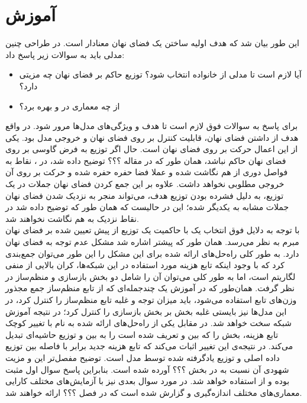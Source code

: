 \section{آموزش \autoencoder{}}
این طور بیان شد که هدف اولیه ساختن یک فضای نهان معنادار است. در طراحی چنین مدلی باید به سوالات زیر پاسخ داد:
\begin{itemize}
	\item
	      آیا لازم است تا مدلی از خانواده \vae{}  انتخاب شود؟ توزیع حاکم بر فضای نهان چه مزیتی دارد؟
	\item
	      از چه معماری در \encoder{} و \decoder{} بهره برد؟
\end{itemize}
برای پاسخ به سوالات فوق لازم است تا هدف و ویژگی‌های مدل‌ها مرور شود. در واقع هدف از داشتن فضای نهان، قابلیت کنترل بر روی فضای نهان و خروجی مدل بود. یکی از این اعمال حرکت بر روی فضای نهان است. حال اگر توزیع به فرض گاوسی بر روی فضای نهان حاکم نباشد، همان طور که در مقاله ؟؟؟ توضیح داده شد، در \autoencoder{}، نقاط به فواصل دوری از هم نگاشت شده و عملا فضا حفره حفره شده و حرکت بر روی آن خروجی مطلوبی نخواهد داشت. علاوه بر این جمع کردن فضای نهان جملات در یک توزیع، به دلیل فشرده بودن توزیع هدف، می‌تواند منجر به نزدیک شدن فضای نهان جملات مشابه به یکدیگر شده؛ این در حالیست که همان طور که توضیح داده شد در   \autoencoder{} نقاط نزدیک به هم نگاشت نخواهند شد.
\\
با توجه به دلایل فوق انتخاب یک \autoencoder{} با حاکمیت یک توزیع از پیش تعیین شده بر فضای نهان مبرم به نظر می‌رسد. همان طور که پیشتر اشاره شد \vae{} مشکل عدم توجه به فضای نهان دارد. به طور کلی راه‌حل‌های ارائه شده برای این مشکل را این طور  می‌توان جمع‌بندی کرد که با وجود اینکه تابع هزینه مورد استفاده در این شبکه‌ها، کران بالایی از منفی لگاریتم \likelihood است، اما به طور کلی می‌توان آن را شامل دو بخش بازسازی و منظم‌ساز در نظر گرفت. همان‌طور که در آموزش یک چندجمله‌ای که از تابع منظم‌ساز جمع مجذور وزن‌های تابع استفاده می‌شود، باید میزان توجه و غلبه تابع منظم‌ساز را کنترل کرد، در این مدل‌ها نیز بایستی غلبه بخش  بر بخش بازسازی را کنترل کرد؛ در نتیجه آموزش شبکه سخت خواهد شد. در مقابل یکی از راه‌حل‌های ارائه شده به نام \wae{} با تغییر کوچک تابع هزینه، بخش  را که بین \priordist{} و \posteriordist{} تعریف شده است را به  بین \priordist{} و توزیع حاشیه‌ای \posterior{} تبدیل می‌کند. در نتیجه‌ی این تغییر اثبات می‌کند که تابع هزینه جدید برابر با فاصله \wasser{} بین توزیع داده اصلی و توزیع یادگرفته شده توسط مدل است. توضیح مفصل‌تر این \autoencoder{} و مزیت شهودی آن نسبت به \vae{} در بخش ؟؟؟ آورده شده است. بنابراین پاسخ سوال اول مثبت بوده و از \wae{} استفاده خواهد شد.
در مورد سوال بعدی نیز با آزمایش‌های مختلف کارایی معماری‌های مختلف اندازه‌گیری و گزارش شده است که در فصل ؟؟؟ ارائه خواهند شد.
